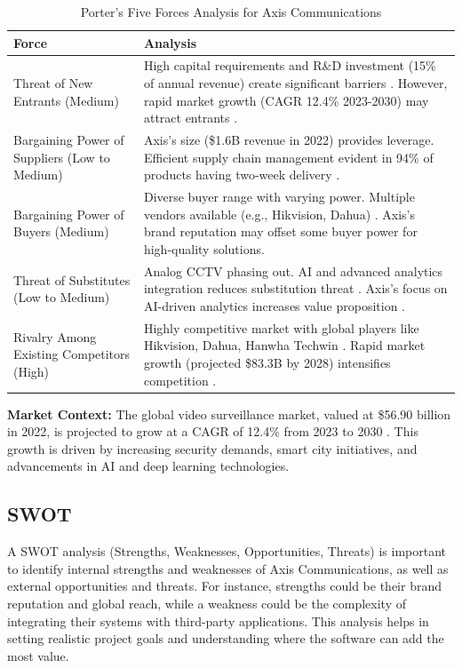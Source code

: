 \documentclass{article}
\begin{document}
\begin{table}[h]
\small
\begin{tabular}{|p{}|p{}|}
\hline
\textbf{Force} & \textbf{Analysis} \\
\hline
Threat of New Entrants \newline (Medium) & 
High capital requirements and R\&D investment (15\% of annual revenue) create significant barriers \cite{axis_newsroom2023}. However, rapid market growth (CAGR 12.4\% 2023-2030) may attract entrants \cite{grandview2023}. \\
\hline
Bargaining Power of Suppliers \newline (Low to Medium) & 
Axis's size (\$1.6B revenue in 2022) provides leverage. Efficient supply chain management evident in 94\% of products having two-week delivery \cite{axis_newsroom2023}. \\
\hline
Bargaining Power of Buyers \newline (Medium) & 
Diverse buyer range with varying power. Multiple vendors available (e.g., Hikvision, Dahua) \cite{stellar2023}. Axis's brand reputation may offset some buyer power for high-quality solutions. \\
\hline
Threat of Substitutes \newline (Low to Medium) & 
Analog CCTV phasing out. AI and advanced analytics integration reduces substitution threat \cite{grandview2023}. Axis's focus on AI-driven analytics increases value proposition \cite{axis_website}. \\
\hline
Rivalry Among Existing Competitors \newline (High) & 
Highly competitive market with global players like Hikvision, Dahua, Hanwha Techwin \cite{stellar2023, grandview2023}. Rapid market growth (projected \$83.3B by 2028) intensifies competition \cite{marketsandmarkets2023}. \\
\hline
\end{tabular}
\caption{Porter's Five Forces Analysis for Axis Communications}
\label{tab:porters_five_forces}
\end{table}

\textbf{Market Context:} The global video surveillance market, valued at \$56.90 billion in 2022, is projected to grow at a CAGR of 12.4\% from 2023 to 2030 \cite{grandview2023}. This growth is driven by increasing security demands, smart city initiatives, and advancements in AI and deep learning technologies.


\subsection{SWOT}
A SWOT analysis (Strengths, Weaknesses, Opportunities, Threats) is important to identify internal strengths and weaknesses of Axis Communications, as well as external opportunities and threats. For instance, strengths could be their brand reputation and global reach, while a weakness could be the complexity of integrating their systems with third-party applications. This analysis helps in setting realistic project goals and understanding where the software can add the most value.
\end{document}
